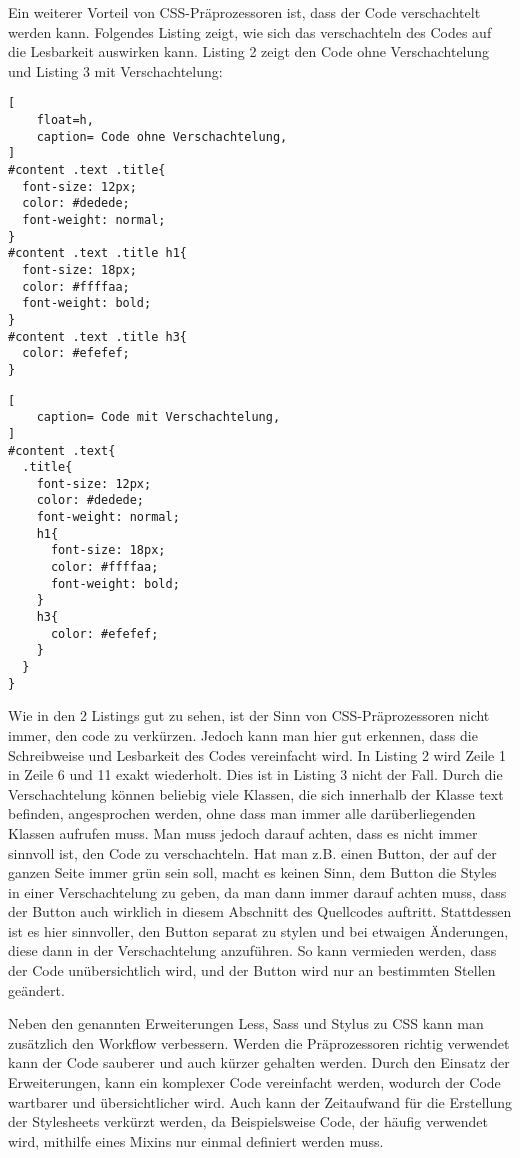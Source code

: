 Ein weiterer Vorteil von CSS-Präprozessoren ist, dass der Code verschachtelt werden kann. Folgendes Listing zeigt, wie sich das verschachteln des Codes auf die Lesbarkeit auswirken kann. Listing 2 zeigt den Code ohne Verschachtelung und Listing 3 mit Verschachtelung:\newline
\begin{lstlisting}[
	float=h,
	caption= Code ohne Verschachtelung,
]
#content .text .title{
  font-size: 12px;
  color: #dedede;
  font-weight: normal;
}
#content .text .title h1{
  font-size: 18px;
  color: #ffffaa;
  font-weight: bold;
}
#content .text .title h3{
  color: #efefef;
}
\end{lstlisting}

\begin{lstlisting}[
	caption= Code mit Verschachtelung,
]
#content .text{
  .title{
    font-size: 12px;
    color: #dedede;
    font-weight: normal;
    h1{
      font-size: 18px;
      color: #ffffaa;
      font-weight: bold;
    }
    h3{
      color: #efefef;
    }
  }
}
\end{lstlisting}

Wie in den 2 Listings gut zu sehen, ist der Sinn von CSS-Präprozessoren nicht immer, den code zu verkürzen. Jedoch kann man hier gut erkennen, dass die Schreibweise und Lesbarkeit des Codes vereinfacht wird. In Listing 2 wird Zeile 1 in Zeile 6 und 11 exakt wiederholt. Dies ist in Listing 3 nicht der Fall. Durch die Verschachtelung können beliebig viele Klassen, die sich innerhalb der Klasse text befinden, angesprochen werden, ohne dass man immer alle darüberliegenden Klassen aufrufen muss. \newline
Man muss jedoch darauf achten, dass es nicht immer sinnvoll ist, den Code zu verschachteln. Hat man z.B. einen Button, der auf der ganzen Seite immer grün sein soll, macht es keinen Sinn, dem Button die Styles in einer Verschachtelung zu geben, da man dann immer darauf achten muss, dass der Button auch wirklich in diesem Abschnitt des Quellcodes auftritt. Stattdessen ist es hier sinnvoller, den Button separat zu stylen und bei etwaigen Änderungen, diese dann in der Verschachtelung anzuführen. So kann vermieden werden, dass der Code unübersichtlich wird, und der Button wird nur an bestimmten Stellen geändert.

Neben den genannten Erweiterungen Less, Sass und Stylus zu CSS kann man zusätzlich den Workflow verbessern. Werden die Präprozessoren richtig verwendet kann der Code sauberer und auch kürzer gehalten werden.\newline
Durch den Einsatz der Erweiterungen, kann ein komplexer Code vereinfacht werden, wodurch der Code wartbarer und übersichtlicher wird. Auch kann der Zeitaufwand für die Erstellung der Stylesheets verkürzt werden, da Beispielsweise Code, der häufig verwendet wird, mithilfe eines Mixins nur einmal definiert werden muss.

